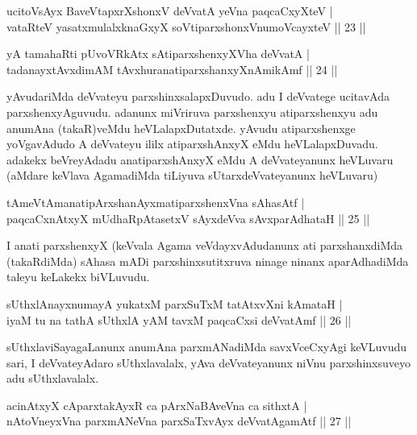 
\begin{shl}
ucitoV\s sAyx BaveVtapxrXshonxV deVvatA yeVna paqcaCxyXteV |\\
vataRteV yasatxmulalxknaGxyX soV\s tiparxshonxV\s numoVcayxteV \hfill || 23 ||
\end{shl}

\begin{shl}
yA tamahaRti pUvoVRkAtx sA\s tiparxshenxyXVha deVvatA |\\
tadanayxtAvxdimAM tAvxhuranatiparxshanxyXnAmikAmf \hfill || 24 ||
\end{shl}

\begin{artha}
yAvudariMda deVvateyu parxshinxsalapxDuvudo. adu I deVvatege ucitavAda parxshenxyAguvudu. adanunx miVriruva parxshenxyu atiparxshenxyu adu anumAna (takaR)veMdu heVLalapxDutatxde. yAvudu atiparxshenxge yoVgavAdudo A deVvateyu ililx atiparxshAnxyX eMdu heVLalapxDuvadu. adakekx beVreyAdadu anatiparxshAnxyX eMdu A deVvateyanunx heVLuvaru (aMdare keVlava AgamadiMda tiLiyuva sUtarxdeVvateyanunx heVLuvaru)
\end{artha}%

\begin{shl}
tAmeVtAmanatipArxshanAyxmatiparxshenxVna sAhasAtf |\\
paqcaCxnAtxyX mUdhaRpAtasetxV sAyxdeVva sAvxparAdhataH \hfill || 25 ||
\end{shl}

\begin{artha}
I anati parxshenxyX (keVvala Agama veVdayxvAdudanunx ati parxshanxdiMda (takaRdiMda) sAhasa mADi parxshinxsutitxruva ninage ninanx aparAdhadiMda taleyu keLakekx biVLuvudu.
\end{artha}

\begin{shl}
sUthxlAnayxnumayA yukatxM parxSuTxM tatAtxvXni kAmataH |\\
iyaM tu na tathA sUthxlA yAM tavxM paqcaCxsi deVvatAmf \hfill || 26 ||
\end{shl}

\begin{artha}
sUthxlaviSayagaLanunx anumAna parxmANadiMda savxVceCxyAgi keVLuvudu sari, I deVvateyAdaro sUthxlavalalx, yAva deVvateyanunx niVnu parxshinxsuveyo adu sUthxlavalalx.
\end{artha}

\begin{shl}
acinAtxyX cAparxtakAyxR ca pArxNaBAveVna ca sithxtA |\\
nAtoV\s neyxVna parxmANeVna parxSaTxvAyx deVvatA\s \s gamAtf \hfill || 27 ||
\end{shl}


